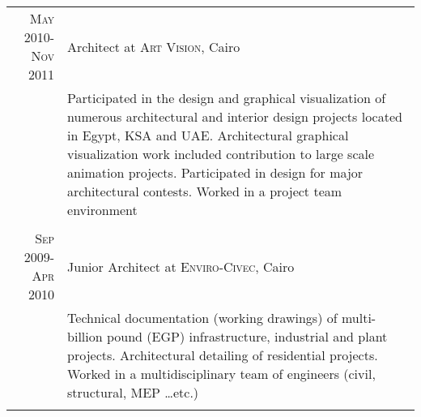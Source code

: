 \documentclass[a4paper,11pt]{article} %
\begin{document}
\begin{tabular}{r|p{11cm}}

\textsc{May 2010-Nov 2011} & Architect at \textsc{Art Vision}, Cairo \emph{}\\
& \footnotesize{Participated in the design and graphical visualization of numerous architectural and interior design projects located in Egypt, KSA and UAE. Architectural graphical visualization work included contribution to large scale animation projects. Participated in design for major architectural contests. Worked in a project team environment}\\
\multicolumn{2}{c}{} \\


\textsc{Sep 2009-Apr 2010} & Junior Architect at \textsc{Enviro-Civec}, Cairo \emph{}\\
& \footnotesize{Technical documentation (working drawings) of multi-billion pound (EGP) infrastructure, industrial and plant projects. Architectural detailing of residential projects. Worked in a multidisciplinary team of engineers (civil, structural, MEP \ldots{}etc.)}\\
\multicolumn{2}{c}{} \\

\end{tabular}

\vspace{0.5cm}
\end{document}
